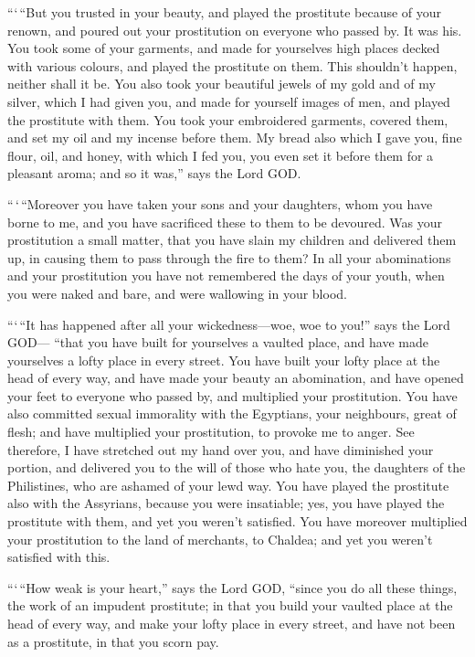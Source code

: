  ```\,``But you trusted in your beauty, and played the
prostitute because of your renown, and poured out your prostitution on
everyone who passed by. It was his.  You took some of your
garments, and made for yourselves high places decked with various
colours, and played the prostitute on them. This shouldn't happen,
neither shall it be.  You also took your beautiful jewels
of my gold and of my silver, which I had given you, and made for
yourself images of men, and played the prostitute with them.
 You took your embroidered garments, covered them, and set
my oil and my incense before them.  My bread also which I
gave you, fine flour, oil, and honey, with which I fed you, you even set
it before them for a pleasant aroma; and so it was,'' says the Lord GOD.

 ``\,`\,``Moreover you have taken your sons and your
daughters, whom you have borne to me, and you have sacrificed these to
them to be devoured. Was your prostitution a small matter, 
that you have slain my children and delivered them up, in causing them
to pass through the fire to them?  In all your abominations
and your prostitution you have not remembered the days of your youth,
when you were naked and bare, and were wallowing in your blood.

 ```\,``It has happened after all your wickedness---woe,
woe to you!'' says the Lord GOD---  ``that you have built
for yourselves a vaulted place, and have made yourselves a lofty place
in every street.  You have built your lofty place at the
head of every way, and have made your beauty an abomination, and have
opened your feet to everyone who passed by, and multiplied your
prostitution.  You have also committed sexual immorality
with the Egyptians, your neighbours, great of flesh; and have multiplied
your prostitution, to provoke me to anger.  See therefore,
I have stretched out my hand over you, and have diminished your portion,
and delivered you to the will of those who hate you, the daughters of
the Philistines, who are ashamed of your lewd way.  You
have played the prostitute also with the Assyrians, because you were
insatiable; yes, you have played the prostitute with them, and yet you
weren't satisfied.  You have moreover multiplied your
prostitution to the land of merchants, to Chaldea; and yet you weren't
satisfied with this.

 ```\,``How weak is your heart,'' says the Lord GOD,
``since you do all these things, the work of an impudent prostitute;
 in that you build your vaulted place at the head of every
way, and make your lofty place in every street, and have not been as a
prostitute, in that you scorn pay.

